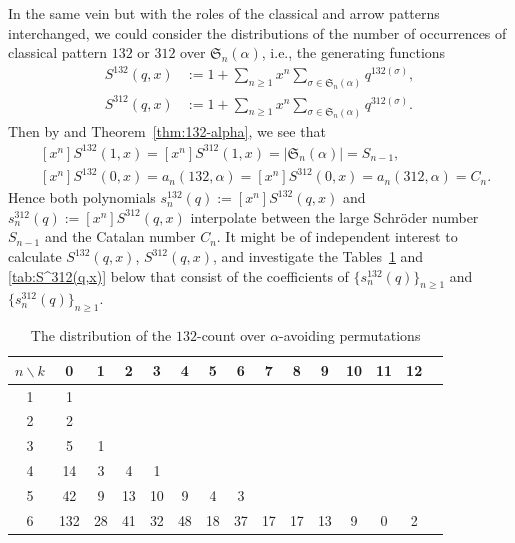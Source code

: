 \documentclass[12pt]{amsart}
\numberwithin{equation}{section}
\theoremstyle{plain}
\def\fS{\mathfrak{S}}
\begin{document}
In the same vein but with the roles of the classical and arrow patterns interchanged, we could consider the distributions of the number of occurrences of classical pattern $132$ or $312$ over $\fS_n(\alpha)$, i.e., the generating functions
\begin{align*}
	S^{132}(q,x) &:= 1+\sum_{n\ge 1}x^n\sum_{\sigma\in\fS_n(\alpha)}q^{132(\sigma)},\\
	S^{312}(q,x) &:= 1+\sum_{n\ge 1}x^n\sum_{\sigma\in\fS_n(\alpha)}q^{312(\sigma)}.
\end{align*}
Then by \cite[Theorem 3.5]{AL2026} and Theorem~\ref{thm:132-alpha}, we see that 
\begin{align*}
&[x^n]S^{132}(1,x)=[x^n]S^{312}(1,x)=|\fS_n(\alpha)|=S_{n-1},\\
&[x^n]S^{132}(0,x)=a_n(132,\alpha)=[x^n]S^{312}(0,x)=a_n(312,\alpha)=C_n.
\end{align*}
Hence both polynomials $s^{132}_n(q):=[x^n]S^{132}(q,x)$ and $s^{312}_n(q):=[x^n]S^{312}(q,x)$ interpolate between the large Schr\"oder number $S_{n-1}$ and the Catalan number $C_n$. It might be of independent interest to calculate $S^{132}(q,x)$, $S^{312}(q,x)$, and investigate the Tables~\ref{tab:S^132(q,x)} and \ref{tab:S^312(q,x)} below that consist of the coefficients of $\{s^{132}_n(q)\}_{n\ge 1}$ and $\{s^{312}_n(q)\}_{n\ge 1}$.

\smallskip 
\begin{table}[!h]
\renewcommand{\arraystretch}{1.1}
    \centering
    \begin{tabular}{c|cccccccccccccc}
        $n \backslash k$ & 0 & 1 & 2 & 3 & 4 & 5 & 6 & 7 & 8 & 9 & 10 & 11 & 12 \\ \hline
        1 & 1 \\ 
        2 & 2 \\ 
        3 & 5 & 1  \\ 
        4 & 14 & 3 & 4 & 1  \\ 
        5 & 42 & 9 & 13 & 10 & 9 & 4 & 3 \\ 
        6 & 132 & 28 & 41 & 32 & 48 & 18 & 37 & 17 & 17 & 13 & 9 & 0 & 2 \\
    \end{tabular}
    \vspace{3mm}
    \caption{The distribution of the $132$-count over $\alpha$-avoiding permutations \label{tab:S^132(q,x)} }
\end{table}
\end{document}
